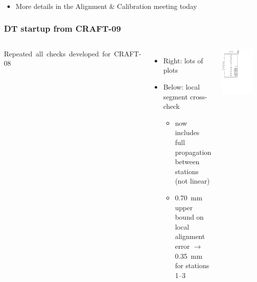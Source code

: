 \documentclass[compress]{beamer}
\begin{document}
\begin{frame}
\vspace{-0.25 cm}
\begin{itemize}
\item More details in the Alignment \& Calibration meeting today
\end{itemize}
\end{frame}

\begin{frame}
\frametitle{DT startup from CRAFT-09}

\begin{columns}
\mbox{Repeated all checks developed for CRAFT-08\hspace{-1 cm}}

\begin{itemize}
\item Right: lots of plots

\item Below: local segment cross-check
\begin{itemize}
\item now includes full propagation between stations (not linear)
\item 0.70~mm upper bound on local alignment error $\to$ 0.35~mm for
  stations 1--3
\end{itemize}
\end{itemize}

\vfill
\includegraphics[height=\linewidth, angle=90]{NOV4_segdiff_x_whze.pdf}


\end{columns}
\end{frame}
\end{document}
